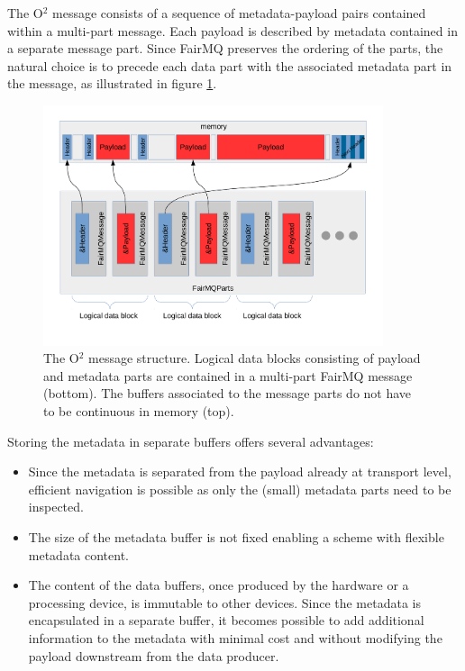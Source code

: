 \documentclass[a4paper,twoside]{article}
\def\O2{O$^2$}
\begin{document}
The \O2 message consists of a sequence of metadata-payload pairs contained within a multi-part message. Each payload is described by metadata contained in a separate message part. Since FairMQ preserves the ordering of the parts, the natural choice is to precede each data part with the associated metadata part in the message, as illustrated in figure \ref{fig:o2message}. 

\begin{figure}[h]
  \centering
  \includegraphics[width=0.89\textwidth]{multipartO2message.pdf}
  \caption{The \O2 message structure. Logical data blocks consisting of payload and metadata parts are contained in a multi-part FairMQ message (bottom). The buffers associated to the message parts do not have to be continuous in memory (top).}
  \label{fig:o2message} 
\end{figure}

Storing the metadata in separate buffers offers several advantages:

\begin{itemize}
  \item Since the metadata is separated from the payload already at transport level, efficient navigation is possible as only the (small) metadata parts need to be inspected.
  \item The size of the metadata buffer is not fixed enabling a scheme with flexible metadata content.
  \item The content of the data buffers, once produced by the hardware or a processing device, is immutable to other devices. Since the metadata is encapsulated in a separate buffer, it becomes possible to add additional information to the metadata with minimal cost and without modifying the payload downstream from the data producer.
\end{itemize}
\end{document}
